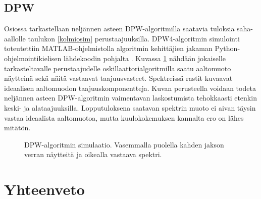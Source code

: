 \documentclass[finnish,12pt,a4paper,pdftex]{article} %
\begin{document}
\subsection{DPW} \label{sec:dpw}

Osiossa tarkastellaan neljännen asteen DPW-algoritmilla saatavia tuloksia saha-aallolle taulukon \ref{kolmiosim} perustaajuuksilla. DPW4-algoritmin simulointi toteutettiin MATLAB-ohjelmistolla algoritmin kehittäjien jakaman Python-ohjelmointikielisen lähdekoodin pohjalta \cite{Koodi}. Kuvassa \ref{fig:dpwsim} nähdään jokaiselle tarkasteltavalle perustaajudelle oskillaattorialgoritmilla saatu aaltomuoto näytteinä sekä näitä vastaavat taajuusvasteet. Spektreissä rastit kuvaavat ideaalisen aaltomuodon taajuuskomponentteja. Kuvan perusteella voidaan todeta neljännen asteen DPW-algoritmin vaimentavan laskostumista tehokkaasti etenkin keski- ja alataajuuksilla. Lopputuloksena saatavan spektrin muoto ei aivan täysin vastaa ideaalista aaltomuotoa, mutta kuulokokemuksen kannalta ero on lähes mitätön.
\begin{figure}[h] 
\begin{center}
\caption{DPW-algoritmin simulaatio. Vasemmalla puolella kahden jakson verran näytteitä ja oikealla vastaava spektri.}
\label{fig:dpwsim}
\end{center}
\end{figure}

\clearpage


\section{Yhteenveto}
\end{document}
